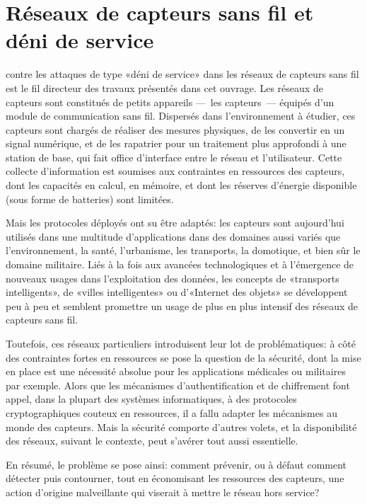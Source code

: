 \section{Réseaux de capteurs sans fil et déni de service}

 contre les attaques de type «déni de service» dans les réseaux de capteurs sans fil est le fil directeur des travaux présentés dans cet ouvrage.\linebreak
Les réseaux de capteurs sont constitués de petits appareils ---~les capteurs~--- équipés d'un module de communication sans fil.
Dispersés dans l'environnement à étudier, ces capteurs sont chargés de réaliser des mesures physiques, de les convertir en un signal numérique, et de les rapatrier pour un traitement plus approfondi à une station de base, qui fait office d'interface entre le réseau et l'utilisateur.
Cette collecte d'information est soumises aux contraintes en ressources des capteurs, dont les capacités en calcul, en mémoire, et dont les réserves d'énergie disponible (sous forme de batteries) sont limitées.

Mais les protocoles déployés ont su être adaptés: les capteurs sont aujourd'hui utilisés dans une multitude d'applications dans des domaines aussi variés que l'environnement, la santé, l'urbanisme, les transports, la domotique, et bien sûr le domaine militaire.
Liés à la fois aux avancées technologiques et à l'émergence de nouveaux usages dans l'exploitation des données, les concepts de «transports intelligents», de «villes intelligentes» ou d'«Internet des objets» se développent peu à peu et semblent promettre un usage de plus en plus intensif des réseaux de capteurs sans fil.

Toutefois, ces réseaux particuliers introduisent leur lot de problématiques: à côté des contraintes fortes en ressources se pose la question de la sécurité, dont la mise en place est une nécessité absolue pour les applications médicales ou militaires par exemple.
Alors que les mécanismes d'authentification et de chiffrement font appel, dans la plupart des systèmes informatiques, à des protocoles cryptographiques couteux en ressources, il a fallu adapter les mécanismes au monde des capteurs.
Mais la sécurité comporte d'autres volets, et la disponibilité des réseaux, suivant le contexte, peut s'avérer tout aussi essentielle.

En résumé, le problème se pose ainsi: comment prévenir, ou à défaut comment détecter puis contourner, tout en économisant les ressources des capteurs, une action d'origine malveillante qui viserait à mettre le réseau hors service?


